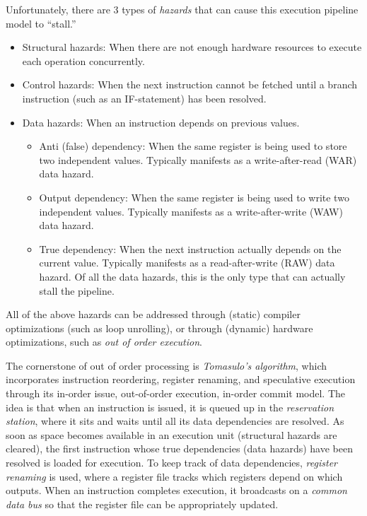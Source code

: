 \documentclass[12pt]{article}
\begin{document}
Unfortunately, there are 3 types of {\it hazards} that can cause this
execution pipeline model to ``stall.''
\begin{itemize}
\item Structural hazards: When there are not enough hardware resources to
execute each operation concurrently.
\item Control hazards: When the next instruction cannot be fetched until
a branch instruction (such as an IF-statement) has been resolved.
\item Data hazards: When an instruction depends on previous values.
\begin{itemize}
\item Anti (false) dependency: When the same register is being used to 
store two independent values. 
Typically manifests as a write-after-read (WAR) data hazard.
\item Output dependency: When the same register is being used to write two
independent values. 
Typically manifests as a write-after-write (WAW) data hazard.
\item True dependency: When the next instruction actually depends on the
current value.
Typically manifests as a read-after-write (RAW) data hazard.
Of all the data hazards, this is the only type that can actually stall
the pipeline.
\end{itemize}
\end{itemize}

All of the above hazards can be addressed through (static) compiler 
optimizations (such as loop unrolling), or through (dynamic) hardware
optimizations, such as {\it out of order execution}.

The cornerstone of out of order processing is {\it Tomasulo's algorithm},
which incorporates instruction reordering, register renaming, and 
speculative execution through its in-order issue, out-of-order execution, 
in-order commit model.
The idea is that when an instruction is issued, it is queued up in the
{\it reservation station}, where it sits and waits until all its data 
dependencies are resolved.
As soon as space becomes available in an execution unit (structural hazards
are cleared), the first instruction whose true dependencies (data hazards) 
have been resolved is loaded for execution.
To keep track of data dependencies, {\it register renaming} is used, where a
register file tracks which registers depend on which outputs.
When an instruction completes execution, it broadcasts on a 
{\it common data bus} so that the register file can be appropriately updated.
\end{document}
